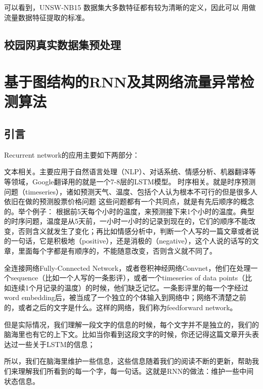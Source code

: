 可以看到，UNSW-NB15 数据集大多数特征都有较为清晰的定义，因此可以
用做流量数据特征提取的标准。 
\section{校园网真实数据集预处理}

\chapter{基于图结构的RNN及其网络流量异常检测算法}

\section{引言}
Recurrent network的应用主要如下两部分：

文本相关。主要应用于自然语言处理（NLP）、对话系统、情感分析、机器翻译等等领域，Google翻译用的就是一个7-8层的LSTM模型。
时序相关。就是时序预测问题（timeseries），诸如预测天气、温度、包括个人认为根本不可行的但是很多人依旧在做的预测股票价格问题
这些问题都有一个共同点，就是有先后顺序的概念的。举个例子： 根据前5天每个小时的温度，来预测接下来1个小时的温度。典型的时序问题，温度是从5天前，一小时一小时的记录到现在的，它们的顺序不能改变，否则含义就发生了变化；再比如情感分析中，判断一个人写的一篇文章或者说的一句话，它是积极地（positive），还是消极的（negative），这个人说的话写的文章，里面每个字都是有顺序的，不能随意改变，否则含义就不同了。

全连接网络Fully-Connected Network，或者卷积神经网络Convnet，他们在处理一个sequence（比如一个人写的一条影评），或者一个timeseries of data points（比如连续1个月记录的温度）的时候，他们缺乏记忆。一条影评里的每一个字经过word embedding后，被当成了一个独立的个体输入到网络中；网络不清楚之前的，或者之后的文字是什么。这样的网络，我们称为feedforward network。

但是实际情况，我们理解一段文字的信息的时候，每个文字并不是独立的，我们的脑海里也有它的上下文。比如当你看到这段文字的时候，你还记得这篇文章开头表达过一些关于LSTM的信息；

所以，我们在脑海里维护一些信息，这些信息随着我们的阅读不断的更新，帮助我们来理解我们所看到的每一个字，每一句话。这就是RNN的做法：维护一些中间状态信息。

